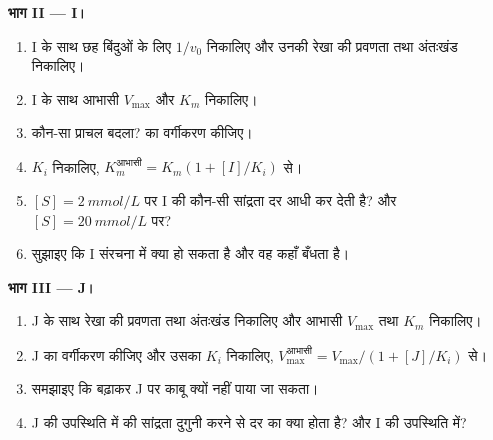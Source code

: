 \begin{problem}
\medskip
\noindent\textbf{भाग II ---  I।}
\begin{enumerate}[resume]
  \item I के साथ छह बिंदुओं के लिए $1/v_0$ निकालिए और उनकी रेखा की
        प्रवणता तथा अंतःखंड निकालिए।
  \item I के साथ आभासी $V_{\max}$ और $K_m$ निकालिए।
  \item कौन-सा प्राचल बदला?  का वर्गीकरण कीजिए।
  \item $K_i$ निकालिए, $K_m^{\text{आभासी}} = K_m(1 + [I]/K_i)$ से।
  \item $[S] = \qty{2}{mmol/L}$ पर I की कौन-सी सांद्रता दर आधी कर देती
        है? और $[S] = \qty{20}{mmol/L}$ पर?
  \item सुझाइए कि I संरचना में क्या हो सकता है और वह कहाँ बँधता है।
\end{enumerate}

\medskip
\noindent\textbf{भाग III ---  J।}
\begin{enumerate}[resume]
  \item J के साथ रेखा की प्रवणता तथा अंतःखंड निकालिए और आभासी
        $V_{\max}$ तथा $K_m$ निकालिए।
  \item J का वर्गीकरण कीजिए और उसका $K_i$ निकालिए,
        $V_{\max}^{\text{आभासी}} =
        V_{\max}/(1 + [J]/K_i)$ से।
  \item समझाइए कि  बढ़ाकर J पर काबू क्यों नहीं पाया जा सकता।
  \item J की उपस्थिति में  की सांद्रता दुगुनी करने से दर का क्या
        होता है? और I की उपस्थिति में?
\end{enumerate}


\end{problem}

